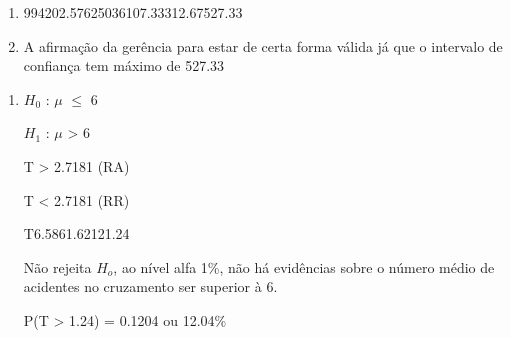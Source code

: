 
\begin{question}
    
    \begin{enumerate}[label={\textbf{\alph*)}}]
        
        \item 

            \begin{formula1}
                {99}{420}{2.576}{250}{36}{107.33}{312.67}{527.33}
            \end{formula1}

        \item 
    
            A afirmação da gerência para estar de certa forma válida já que o intervalo de 
            confiança tem máximo de 527.33

    \end{enumerate}
\end{question}


\begin{question}
    
    \begin{enumerate}[label={\textbf{\alph*)}}]
        
        \item 
    
            $H_0$ : $\mu$ $\leq$ 6 

            $H_1$ : $\mu$ > 6 
        
            T > 2.7181 (RA)

            T < 2.7181 (RR)

            \begin{formula7}
                {T}{6.58}{6}{1.62}{12}{1.24}
            \end{formula7}

            Não rejeita $H_o$, ao nível alfa 1\%, não há evidências sobre o número médio de 
            acidentes no cruzamento ser superior à 6.

            P(T > 1.24) = 0.1204 ou 12.04\%

    \end{enumerate}
\end{question}


